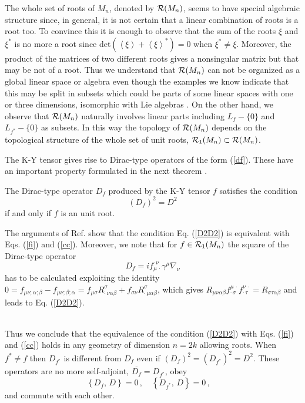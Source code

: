 \documentclass[a4paper,12pt]{article}
\begin{document}
The whole set of roots of $M_n$, denoted by  ${\cal R}(M_n)$, seems to have 
special algebraic structure since, in general, it is not certain that a linear 
combination of roots is a root too. To convince this it is enough to observe 
that the sum of the roots $\xi$ and  $\xi^*$ is no more a root since 
det$(\left<\xi\right>+\left<\xi\right>^*)=0$ when $\xi^*\not=\xi$. Moreover, 
the product of the matrices of two different roots gives a nonsingular matrix 
but that may be not of a root. Thus we understand that ${\cal R}(M_n)$ can not 
be organized as a global linear space or algebra even though the examples we 
know indicate that this may be split in subsets which could be parts of some 
linear spaces with one or three dimensions, isomorphic with Lie algebras 
\cite{CV1,K2}. On the other hand, we observe that ${\cal R}(M_n)$ naturally 
involves linear parts including  $L_f-\{0\}$ and $L_{f^*}-\{0\}$ as 
subsets. In this way  the topology of ${\cal R}(M_n)$  depends on the 
topological structure of the whole set of unit roots, ${\cal R}_1(M_n)\subset 
{\cal R}(M_n)$. 

The K-Y tensor gives rise to  Dirac-type operators of the form 
(\ref{df}). These have  an important property formulated in the next theorem 
\cite{K1}.
\begin{theor}\label{D2D}
The Dirac-type operator $D_f$ produced by the K-Y tensor $f$  
satisfies the  condition  
\begin{equation}\label{D2D2}
(D_{f})^2=D^2 
\end{equation}
if and only if $f$ is an unit root. 
\end{theor}
\begin{demo}
The arguments of Ref. \cite{K1} show that the condition Eq. (\ref{D2D2}) is 
equivalent  with Eqs. (\ref{fi}) and (\ref{cc}). 
Moreover, we note that for $f\in {\cal R}_1(M_n)$  the square of 
the Dirac-type operator
\begin{equation}\label{Dirf}
D_f=if_{\mu\,\cdot}^{\cdot\,\nu}\gamma^{\mu}\nabla_{\nu}
\end{equation}
has to be calculated exploiting  the identity 
$0=f_{\mu\nu;\alpha;\beta} -f_{\mu\nu;\beta;\alpha}=
f_{\mu\sigma} R^{\sigma}_{\cdot\,\nu\alpha\beta}+
f_{\sigma\nu} R^{\sigma}_{\cdot\,\mu\alpha\beta}$,
which gives  
$R_{\mu\nu\alpha\beta}f^{\mu\,\cdot}_{\cdot\,\sigma} f^{\nu\,\cdot}_{\cdot\,
\tau}
=R_{\sigma\tau\alpha\beta}$ and leads to Eq. (\ref{D2D2}). 
\end{demo}\\
Thus we  conclude that the equivalence of the condition (\ref{D2D2}) 
with Eqs. (\ref{fi}) and (\ref{cc}) holds in any geometry of dimension $n=2k$ 
allowing roots. When $f^*\not=f$ then $D_{f^*}$ is different from $D_f$ even 
if $(D_f)^2=(D_{f^*})^2=D^2$. These operators are no more self-adjoint, 
$\overline{D_f}=D_{f^*}$, obey
\begin{equation}\label{DDO}
\left\{ D_{f},\,D\right\}=0\,,\quad
\left\{ D_{f^*},\,D\right\}=0\,,\quad
\end{equation}
and commute with each other.  
\end{document}
